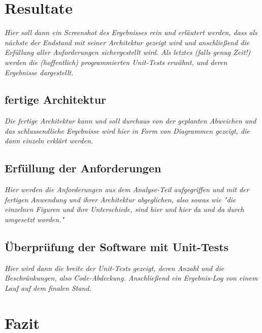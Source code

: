 \section{Resultate}
\label{sec:Resultate}

\emph{Hier soll dann ein Screenshot des Ergebnisses rein und erläutert werden, dass als nächste der Endstand mit seiner Architektur gezeigt wird und anschließend die Erfüllung aller Anforderungen sichergestellt wird. Als letztes (falls genug Zeit!) werden die (hoffentlich) programmierten Unit-Tests erwähnt, und deren Ergebnisse dargestellt.}

\subsection{fertige Architektur}
\label{subsec:f_architektur}

\emph{Die fertige Architektur kann und soll durchaus von der geplanten Abweichen und das schlussendliche Ergebnisse wird hier in Form von Diagrammen gezeigt, die dann einzeln erklärt werden.}

\subsection{Erfüllung der Anforderungen}
\label{subsec:erfullung_anforderungen}

\emph{Hier werden die Anforderungen aus dem Analyse-Teil aufgegriffen und mit der fertigen Anwendung und ihrer Architektur abgeglichen, also sowas wie "die einzelnen Figuren und ihre Unterschiede, sind hier und hier da und da durch umgesetzt worden."}

\subsection{Überprüfung der Software mit Unit-Tests}
\label{subsec:unittests}

\emph{Hier wird dann die breite der Unit-Tests gezeigt, deren Anzahl und die Beschränkungen, also Code-Abdeckung. Anschließend ein Ergebnis-Log von einem Lauf auf dem finalen Stand.}


\section{Fazit}
\label{sec:Fazit}